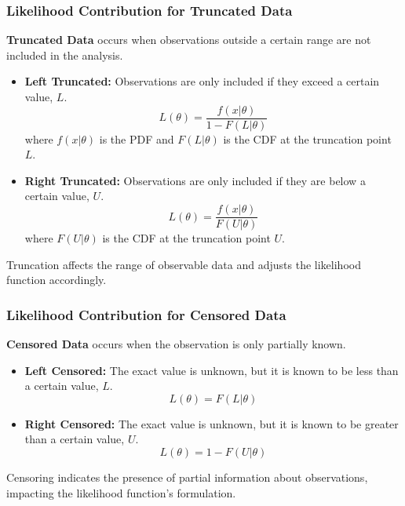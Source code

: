 \documentclass[compress,mathserif]{beamer}
\begin{document}
\begin{frame}
\frametitle{Likelihood Contribution for Truncated Data}

\textbf{Truncated Data} occurs when observations outside a certain range are not included in the analysis. 

\begin{itemize}
    \item \textbf{Left Truncated:} Observations are only included if they exceed a certain value, \(L\).
    \[
    L(\theta) = \frac{f(x|\theta)}{1 - F(L|\theta)}
    \]
    where \(f(x|\theta)\) is the PDF and \(F(L|\theta)\) is the CDF at the truncation point \(L\).

    \item \textbf{Right Truncated:} Observations are only included if they are below a certain value, \(U\).
    \[
    L(\theta) = \frac{f(x|\theta)}{F(U|\theta)}
    \]
    where \(F(U|\theta)\) is the CDF at the truncation point \(U\).
\end{itemize}

Truncation affects the range of observable data and adjusts the likelihood function accordingly.

\end{frame}

\begin{frame}
\frametitle{Likelihood Contribution for Censored Data}

\textbf{Censored Data} occurs when the observation is only partially known.

\begin{itemize}
    \item \textbf{Left Censored:} The exact value is unknown, but it is known to be less than a certain value, \(L\).
    \[
    L(\theta) = F(L|\theta)
    \]
    
    \item \textbf{Right Censored:} The exact value is unknown, but it is known to be greater than a certain value, \(U\).
    \[
    L(\theta) = 1 - F(U|\theta)
    \]
\end{itemize}

Censoring indicates the presence of partial information about observations, impacting the likelihood function's formulation.

\end{frame}
\end{document}
